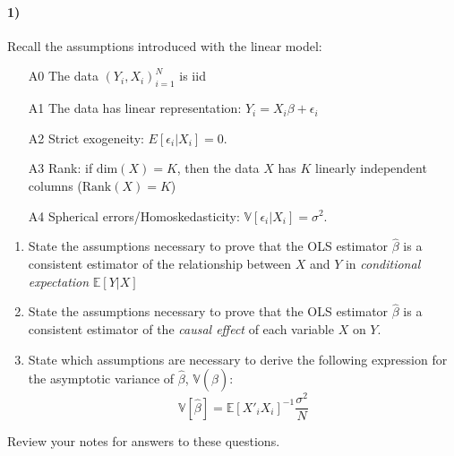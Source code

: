 \documentclass[12pt]{article}
\newcommand\BB{\mathbb}
\newcommand\EE{\mathbb{E}}
\newcommand\h{\hat}
\newcommand\eps{\epsilon}
\numberwithin{equation}{section}
\numberwithin{figure}{section}
\numberwithin{table}{section}
\begin{document}
\paragraph{1)} Recall the assumptions introduced with the linear model:
\begin{itemize}
\item[A0] The data $(Y_i,X_i)_{i=1}^N$ is iid
\item[A1] The data has linear representation: $Y_i = X_i\beta + \eps_i$
\item[A2] Strict exogeneity: $E[\eps_i|X_i]=0$.
\item[A3] Rank: if $\text{dim}(X)=K$, then the data $X$ has $K$ linearly independent columns ($\text{Rank}(X)=K$)
\item[A4] Spherical errors/Homoskedasticity: $\BB{V}[\eps_i|X_i] = \sigma^2$.
\end{itemize}
\begin{enumerate}
\item State the assumptions necessary to prove that the OLS estimator $\h\beta$ is a consistent estimator of the relationship between $X$ and $Y$ in \emph{conditional expectation} $\mathbb{E}[Y|X]$
\item State the assumptions necessary to prove that the OLS estimator $\h\beta$ is a consistent estimator of the \emph{causal effect} of each variable $X$ on $Y$.
\item State which assumptions are necessary to derive the following expression for the asymptotic variance of $\h{\beta}$, $\mathbb{V}(\h\beta)$:
  \[ \BB{V}[\h\beta] = \EE[X'_iX_i]^{-1}\frac{\sigma^2}{N} \]
\end{enumerate}
{\color{blue} Review your notes for answers to these questions.}
\end{document}
